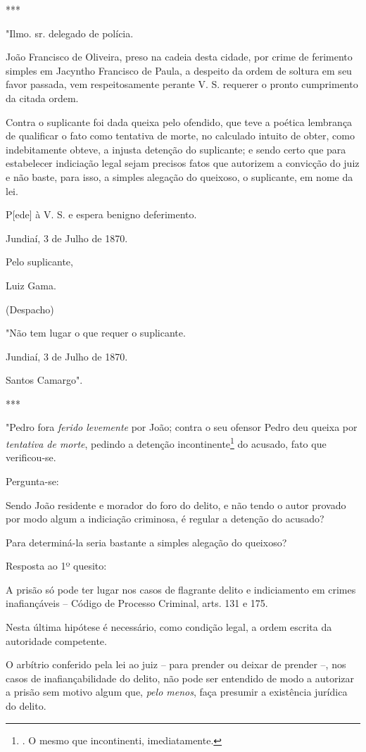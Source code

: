 ***

"Ilmo. sr. delegado de polícia.

João Francisco de Oliveira, preso na cadeia desta cidade, por crime de
ferimento simples em Jacyntho Francisco de Paula, a despeito da ordem de
soltura em seu favor passada, vem respeitosamente perante V. S. requerer
o pronto cumprimento da citada ordem.

Contra o suplicante foi dada queixa pelo ofendido, que teve a poética
lembrança de qualificar o fato como tentativa de morte, no calculado
intuito de obter, como indebitamente obteve, a injusta detenção do
suplicante; e sendo certo que para estabelecer indiciação legal sejam
precisos fatos que autorizem a convicção do juiz e não baste, para isso,
a simples alegação do queixoso, o suplicante, em nome da lei.

P{[}ede{]} à V. S. e espera benigno deferimento.

Jundiaí, 3 de Julho de 1870.

Pelo suplicante,

Luiz Gama.

(Despacho)

"Não tem lugar o que requer o suplicante.

Jundiaí, 3 de Julho de 1870.

Santos Camargo".

***

"Pedro fora \emph{ferido levemente} por João; contra o seu ofensor Pedro
deu queixa por \emph{tentativa de morte}, pedindo a detenção
incontinente\footnote{. O mesmo que incontinenti, imediatamente.} do
acusado, fato que verificou-se.

Pergunta-se:

Sendo João residente e morador do foro do delito, e não tendo o autor
provado por modo algum a indiciação criminosa, é regular a detenção do
acusado?

Para determiná-la seria bastante a simples alegação do queixoso?

Resposta ao 1º quesito:

A prisão só pode ter lugar nos casos de flagrante delito e indiciamento
em crimes inafiançáveis -- Código de Processo Criminal, arts. 131 e 175.

Nesta última hipótese é necessário, como condição legal, a ordem escrita
da autoridade competente.

O arbítrio conferido pela lei ao juiz -- para prender ou deixar de
prender --, nos casos de inafiançabilidade do delito, não pode ser
entendido de modo a autorizar a prisão sem motivo algum que, \emph{pelo
menos}, faça presumir a existência jurídica do delito.

